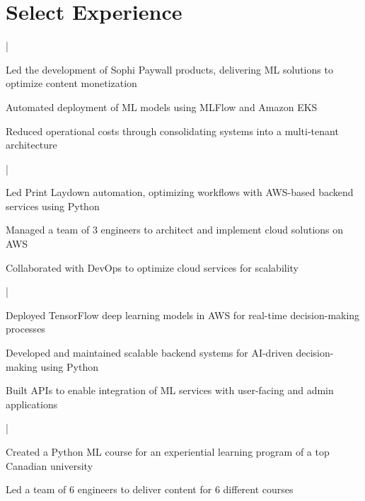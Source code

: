 \section{Select Experience}
 |
\begin{tightemize}
\item{Led the development of Sophi Paywall products, delivering ML solutions to optimize content monetization}
\item{Automated deployment of ML models using MLFlow and Amazon EKS}
\item{Reduced operational costs through consolidating systems into a multi-tenant architecture}
\end{tightemize}
\sectionsep

 |
\begin{tightemize}
\item{Led Print Laydown automation, optimizing workflows with AWS-based backend services using Python}
\item{Managed a team of 3 engineers to architect and implement cloud solutions on AWS}
\item{Collaborated with DevOps to optimize cloud services for scalability}
\end{tightemize}
\sectionsep

 |
\begin{tightemize}
\item {Deployed TensorFlow deep learning models in AWS for real-time decision-making processes}
\item{Developed and maintained scalable backend systems for AI-driven decision-making using Python}
\item{Built APIs to enable integration of ML services with user-facing and admin applications}
\end{tightemize}
\sectionsep

 |
\begin{tightemize}
\item{Created a Python ML course for an experiential learning program of a top Canadian university}
\item{Led a team of 6 engineers to deliver content for 6 different courses}
\end{tightemize}
\sectionsep

